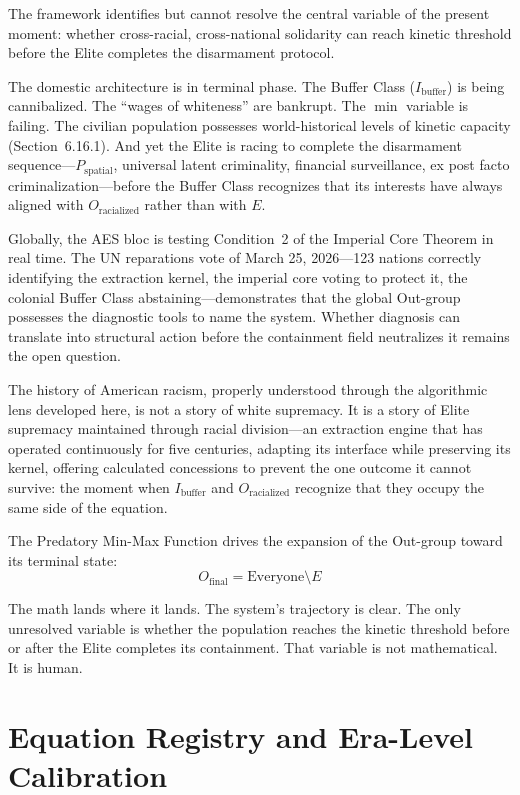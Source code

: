 \documentclass[12pt,openany]{book}
\begin{document}
The framework identifies but cannot resolve the central variable of the present moment: whether cross-racial, cross-national solidarity can reach kinetic threshold before the Elite completes the disarmament protocol.

The domestic architecture is in terminal phase. The Buffer Class ($I_{\text{buffer}}$) is being cannibalized. The ``wages of whiteness'' are bankrupt. The $\min$ variable is failing. The civilian population possesses world-historical levels of kinetic capacity (Section~6.16.1). And yet the Elite is racing to complete the disarmament sequence---$P_{\text{spatial}}$, universal latent criminality, financial surveillance, ex post facto criminalization---before the Buffer Class recognizes that its interests have always aligned with $O_{\text{racialized}}$ rather than with $E$.

Globally, the AES bloc is testing Condition~2 of the Imperial Core Theorem in real time. The UN reparations vote of March 25, 2026---123 nations correctly identifying the extraction kernel, the imperial core voting to protect it, the colonial Buffer Class abstaining---demonstrates that the global Out-group possesses the diagnostic tools to name the system. Whether diagnosis can translate into structural action before the containment field neutralizes it remains the open question.

The history of American racism, properly understood through the algorithmic lens developed here, is not a story of white supremacy. It is a story of Elite supremacy maintained through racial division---an extraction engine that has operated continuously for five centuries, adapting its interface while preserving its kernel, offering calculated concessions to prevent the one outcome it cannot survive: the moment when $I_{\text{buffer}}$ and $O_{\text{racialized}}$ recognize that they occupy the same side of the equation.

The Predatory Min-Max Function drives the expansion of the Out-group toward its terminal state:
\[
O_{\text{final}} = \text{Everyone} \setminus E
\]

The math lands where it lands. The system's trajectory is clear. The only unresolved variable is whether the population reaches the kinetic threshold before or after the Elite completes its containment. That variable is not mathematical. It is human.

\appendix

\chapter{Equation Registry and Era-Level Calibration}
\label{sec:equation_registry}
\end{document}
